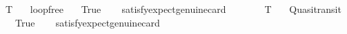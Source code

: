 \begin{isabellebody}
\ T{}{\isacharcolon}{\kern0pt}\isanewline
\ \ \ loopfree\isanewline
\ \ \ True\isanewline
\ \ \isamarkupfalse%
\ {\isacharbrackleft}{\kern0pt}satisfy{\isacharcomma}{\kern0pt}expect{\isacharequal}{\kern0pt}genuine{\isacharcomma}{\kern0pt}card{\isacharequal}{\kern0pt}{}{\isacharbrackright}{\kern0pt}\ \ %
\ \isanewline
%
\isadelimproof
\ \ %
\endisadelimproof
%
\isatagproof
{}\isamarkupfalse%
%
\endisatagproof
{\isafoldproof}%
%
\isadelimproof
\isanewline
%
\endisadelimproof
\isanewline
{}\isamarkupfalse%
\ T{}{\isacharcolon}{\kern0pt}\isanewline
\ \ \ Quasitransit\isanewline
\ \ \ True\isanewline
\ \ \isamarkupfalse%
\ {\isacharbrackleft}{\kern0pt}satisfy{\isacharcomma}{\kern0pt}expect{\isacharequal}{\kern0pt}genuine{\isacharcomma}{\kern0pt}card{\isacharequal}{\kern0pt}{}{\isacharbrackright}{\kern0pt}\ \ %
\isanewline
%
\isadelimproof
\ \ %
\endisadelimproof
%
\isatagproof
{}\isamarkupfalse%
%
\endisatagproof
{\isafoldproof}%
%
\isadelimproof
\isanewline
%
\endisadelimproof
%
\isadelimtheory
\isanewline
%
\endisadelimtheory
%
\isatagtheory
{}\isamarkupfalse%
%
\endisatagtheory
{\isafoldtheory}%
%
\isadelimtheory
%
\endisadelimtheory
%
\end{isabellebody}%
\endinput
